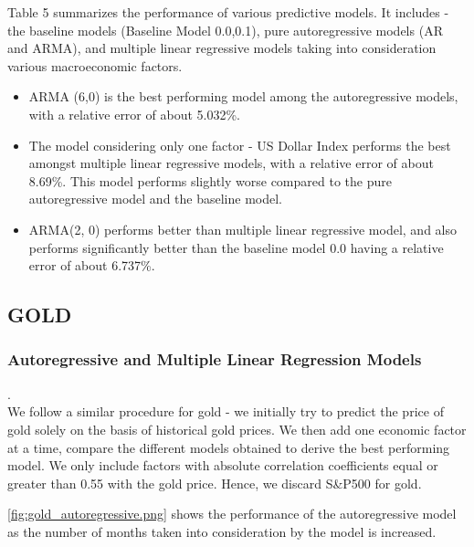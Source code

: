 \documentclass[runningheads]{llncs}
\begin{document}
\noindent Table 5 summarizes the performance of various predictive models. It includes - the baseline models (Baseline Model 0.0,0.1), pure autoregressive models (AR and ARMA), and multiple linear regressive models taking into consideration various macroeconomic factors.

\begin{itemize}
\item ARMA (6,0) is the best performing model among the autoregressive models, with a relative error of about 5.032\%.\\

\item The model considering only one factor - US Dollar Index performs the best amongst multiple linear regressive models, with a relative error of about 8.69\%. This model performs slightly worse compared to the pure autoregressive model and the baseline model.\\

\item ARMA(2, 0) performs better than multiple linear regressive model, and also performs significantly better than the baseline model 0.0 having a relative error of about 6.737\%.\\

\end{itemize}

\newpage
\subsection {GOLD}

\subsubsection {Autoregressive and Multiple Linear Regression Models}.\\

We follow a similar procedure for gold - we initially try to predict the price of gold solely on the basis of historical gold prices. We then add one economic factor at a time, compare the different models obtained to derive the best performing model. We only include factors with absolute correlation coefficients equal or greater than 0.55 with the gold price. Hence, we discard S\&P500 for gold.


\noindent \autoref{fig:gold_autoregressive.png} shows the performance of the autoregressive model as the number of months taken into consideration by the model is increased. \\
\end{document}
